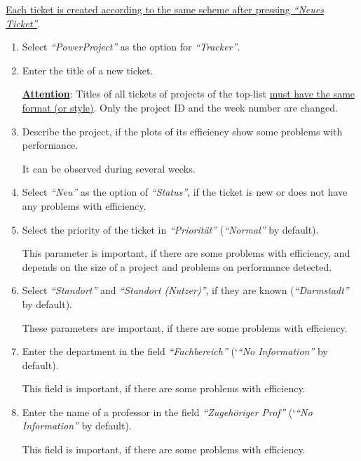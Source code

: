 \documentclass[12pt,a4paper,onecolumn]{article}
\begin{document}
\underline{Each ticket is created according to the same scheme after pressing \textit{``Neues Ticket''}}.

\begin{enumerate} 

\item Select \textit{``PowerProject''} as the option for \textit{``Tracker''}.

\item Enter the title of a new ticket.
\vspace{\baselineskip}

\underline{\textbf{Attention}}: Titles of all tickets of projects of the top-list \underline{must have the same format (or style)}.
Only the project ID and the week number are changed.
\vspace{\baselineskip}

\item Describe the project, if the plots of its efficiency show some problems with performance.

It can be observed during several weeks.

\item Select \textit{``Neu''} as the option of \textit{``Status''}, if the ticket is new or does not have any problems with efficiency.

\item Select the priority of the ticket in \textit{``Priorit\"at''} (\textit{``Normal''} by default).

This parameter is important, if there are some problems with efficiency,
and depends on the size of a project and problems on performance detected.

\item Select \textit{``Standort''} and \textit{``Standort (Nutzer)''}, if they are known (\textit{``Darmstadt''} by default).

These parameters are important, if there are some problems with efficiency.

\item Enter the department in the field \textit{``Fachbereich''} (`\textit{``No Information''} by default).

This field is important, if there are some problems with efficiency.

\item Enter the name of a professor in the field \textit{``Zugeh\"origer Prof''} (`\textit{``No Information''} by default).

This field is important, if there are some problems with efficiency.


\end{enumerate}
\end{document}
